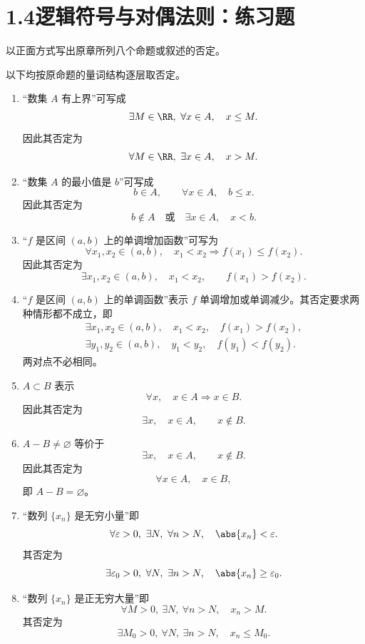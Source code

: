 \section*{1.4\quad 逻辑符号与对偶法则：练习题}

\begin{xexercise}[1.4 练习题]
以正面方式写出原章所列八个命题或叙述的否定。
\end{xexercise}
\begin{xsolution}
以下均按原命题的量词结构逐层取否定。
\begin{enumerate}[label=(\arabic*)]
  \item “数集 $A$ 有上界”可写成
  \[
    \exists M\in\RR,\ \forall x\in A,\quad x\le M.
  \]
  因此其否定为
  \[
    \forall M\in\RR,\ \exists x\in A,\quad x>M.
  \]

  \item “数集 $A$ 的最小值是 $b$”可写成
  \[
    b\in A,
    \qquad
    \forall x\in A,\quad b\le x.
  \]
  因此其否定为
  \[
    b\notin A
    \quad\text{或}\quad
    \exists x\in A,\quad x<b.
  \]

  \item “$f$ 是区间 $(a,b)$ 上的单调增加函数”可写为
  \[
    \forall x_1,x_2\in(a,b),\quad
    x_1<x_2\Longrightarrow f(x_1)\le f(x_2).
  \]
  因此其否定为
  \[
    \exists x_1,x_2\in(a,b),\quad
    x_1<x_2,\qquad f(x_1)>f(x_2).
  \]

  \item “$f$ 是区间 $(a,b)$ 上的单调函数”表示 $f$ 单调增加或单调减少。其否定要求两种情形都不成立，即
  \[
  \begin{gathered}
    \exists x_1,x_2\in(a,b),\quad x_1<x_2,\quad f(x_1)>f(x_2),\\
    \exists y_1,y_2\in(a,b),\quad y_1<y_2,\quad f(y_1)<f(y_2).
  \end{gathered}
  \]
  两对点不必相同。

  \item $A\subset B$ 表示
  \[
    \forall x,\quad x\in A\Longrightarrow x\in B.
  \]
  因此其否定为
  \[
    \exists x,\quad x\in A,\qquad x\notin B.
  \]

  \item $A-B\ne\varnothing$ 等价于
  \[
    \exists x,\quad x\in A,\qquad x\notin B.
  \]
  因此其否定为
  \[
    \forall x\in A,\quad x\in B,
  \]
  即 $A-B=\varnothing$。

  \item “数列 $\{x_n\}$ 是无穷小量”即
  \[
    \forall\varepsilon>0,\ \exists N,\ \forall n>N,
    \quad \abs{x_n}<\varepsilon.
  \]
  其否定为
  \[
    \exists\varepsilon_0>0,\ \forall N,\ \exists n>N,
    \quad \abs{x_n}\ge\varepsilon_0.
  \]

  \item “数列 $\{x_n\}$ 是正无穷大量”即
  \[
    \forall M>0,\ \exists N,\ \forall n>N,
    \quad x_n>M.
  \]
  其否定为
  \[
    \exists M_0>0,\ \forall N,\ \exists n>N,
    \quad x_n\le M_0.
  \]
\end{enumerate}
\end{xsolution}
